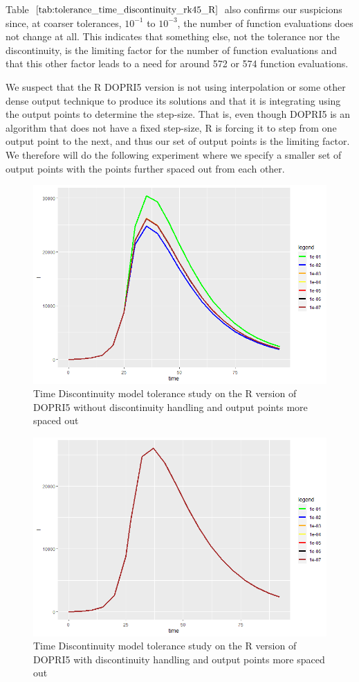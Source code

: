 Table $\ref{tab:tolerance_time_discontinuity_rk45_R}$ also confirms our suspicions since, at coarser tolerances, $10^{-1}$ to $10^{-3}$, the number of function evaluations does not change at all. This indicates that something else, not the tolerance nor the discontinuity, is the limiting factor for the number of function evaluations and that this other factor leads to a need for around 572 or 574 function evaluations.

We suspect that the R DOPRI5 version is not using interpolation or some other dense output technique to produce its solutions and that it is integrating using the output points to determine the step-size. That is, even though DOPRI5 is an algorithm that does not have a fixed step-size, R is forcing it to step from one output point to the next, and thus our set of output points is the limiting factor. We therefore will do the following experiment where we specify a smaller set of output points with the points further spaced out from each other.

\begin{figure}[H]
\centering
\includegraphics[width=0.7\linewidth]{./figures/tolerance_time_rk45_further_no_event_R}
\caption{Time Discontinuity model tolerance study on the R version of DOPRI5 without discontinuity handling and output points more spaced out}
\label{fig:tolerance_time_rk45_further_no_event_R}
\end{figure}

\begin{figure}[H]
\centering
\includegraphics[width=0.7\linewidth]{./figures/tolerance_time_rk45_further_with_event_R}
\caption{Time Discontinuity model tolerance study on the R version of DOPRI5 with discontinuity handling and output points more spaced out}
\label{fig:tolerance_time_rk45_further_with_event_R}
\end{figure}


